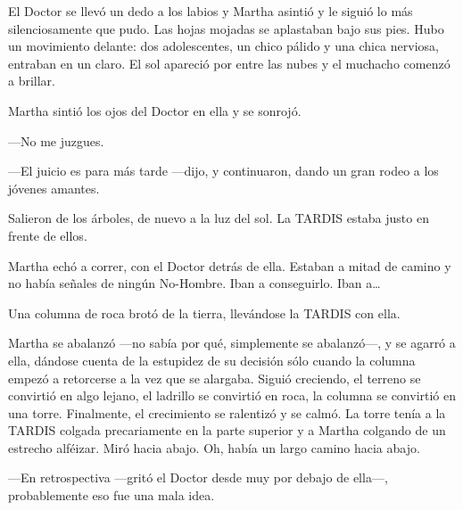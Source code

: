 El Doctor se llevó un dedo a los labios y Martha asintió y le siguió lo más silenciosamente que pudo. Las hojas mojadas se aplastaban bajo sus pies. Hubo un movimiento delante: dos adolescentes, un chico pálido y una chica nerviosa, entraban en un claro. El sol apareció por entre las nubes y el muchacho comenzó a brillar.

Martha sintió los ojos del Doctor en ella y se sonrojó.

---No me juzgues.

---El juicio es para más tarde ---dijo, y continuaron, dando un gran rodeo a los jóvenes amantes.

Salieron de los árboles, de nuevo a la luz del sol. La TARDIS estaba justo en frente de ellos.

Martha echó a correr, con el Doctor detrás de ella. Estaban a mitad de camino y no había señales de ningún No-Hombre. Iban a conseguirlo. Iban a\ldots{}

Una columna de roca brotó de la tierra, llevándose la TARDIS con ella.

Martha se abalanzó ---no sabía por qué, simplemente se abalanzó---, y se agarró a ella, dándose cuenta de la estupidez de su decisión sólo cuando la columna empezó a retorcerse a la vez que se alargaba. Siguió creciendo, el terreno se convirtió en algo lejano, el ladrillo se convirtió en roca, la columna se convirtió en una torre. Finalmente, el crecimiento se ralentizó y se calmó. La torre tenía a la TARDIS colgada precariamente en la parte superior y a Martha colgando de un estrecho alféizar. Miró hacia abajo. Oh, había un largo camino hacia abajo.

---En retrospectiva ---gritó el Doctor desde muy por debajo de ella---, probablemente eso fue una mala idea.

